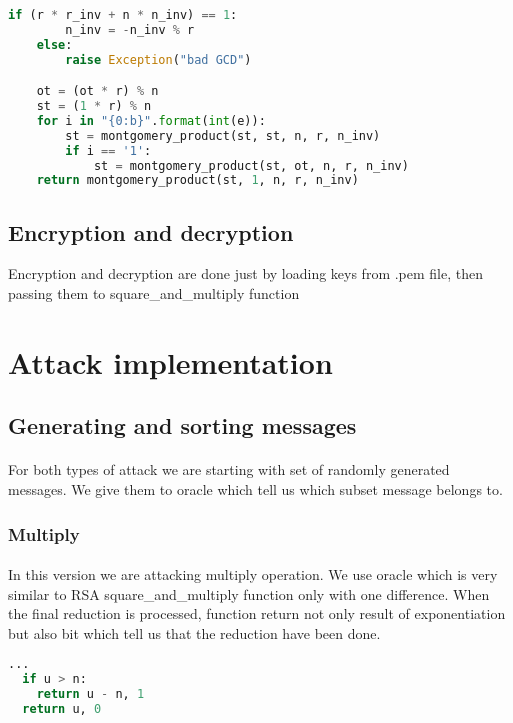 \documentclass[thesis=B,english]{FITthesis}[2012/10/20]
\begin{document}
{\begin{lstlisting}[language=Python]
    if (r * r_inv + n * n_inv) == 1:
        n_inv = -n_inv % r
    else:
        raise Exception("bad GCD")

    ot = (ot * r) % n
    st = (1 * r) % n
    for i in "{0:b}".format(int(e)):
        st = montgomery_product(st, st, n, r, n_inv)
        if i == '1':
            st = montgomery_product(st, ot, n, r, n_inv)
    return montgomery_product(st, 1, n, r, n_inv)
\end{lstlisting}

\subsection{Encryption and decryption}{
Encryption and decryption are done just by loading keys from .pem file, then passing them to square\_and\_multiply function
}

\section{Attack implementation}

\subsection{Generating and sorting messages}
\paragraph*{}{ 
For both types of attack we are starting with set of randomly generated messages. We give them to oracle which tell us which subset message belongs to.

}

\subsubsection{Multiply}
\paragraph*{}{
In this version we are attacking multiply operation. We use oracle which is very similar to RSA square\_and\_multiply function only with one difference.
When the final reduction is processed, function return not only result of exponentiation but also bit which tell us that the reduction have been done.}

\begin{lstlisting}[language=Python]
  ...
  if u > n:
    return u - n, 1
  return u, 0
\end{lstlisting}

}
\end{document}
